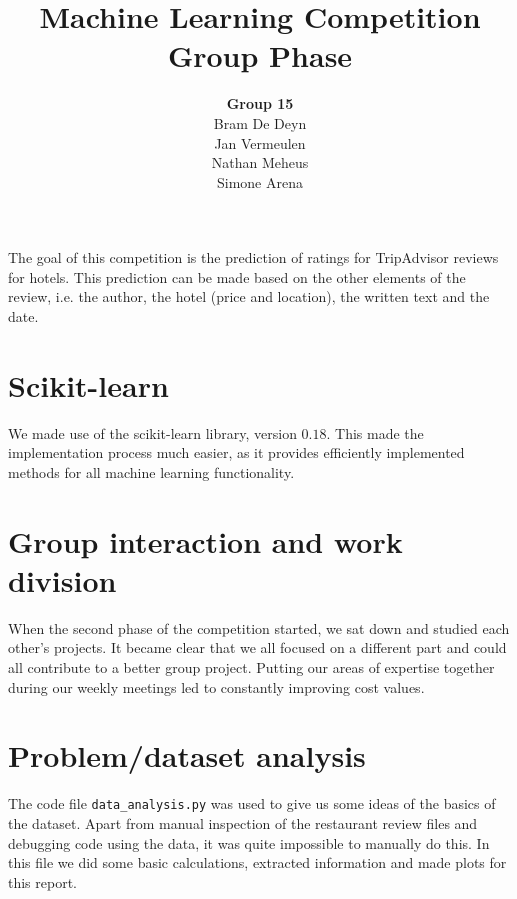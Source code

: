 \documentclass[a4paper,12pt]{article}
\begin{document}
\title{Machine Learning Competition \\
\textbf{Group Phase} \\
}
\author{
\textbf{Group 15} \\
Bram De Deyn \\
Jan Vermeulen \\
Nathan Meheus \\
Simone Arena}
\maketitle
{}

The goal of this competition is the prediction of ratings for TripAdvisor reviews for hotels. This prediction can be made based on the other elements of the review, i.e. the author, the hotel (price and location), the written text and the date.

\section{Scikit-learn}

We made use of the scikit-learn library, version $0.18$. This made the implementation process much easier, as it provides efficiently implemented methods for all machine learning functionality.

\section{Group interaction and work division}

When the second phase of the competition started, we sat down and studied each other's projects. It became clear that we all focused on a different part and could all contribute to a better group project. Putting our areas of expertise together during our weekly meetings led to constantly improving cost values.

\section{Problem/dataset analysis}

The code file \texttt{data\_analysis.py} was used to give us some ideas of the basics of the dataset. Apart from manual inspection of the restaurant review files and debugging code using the data, it was quite impossible to manually do this. In this file we did some basic calculations, extracted information and made plots for this report.
\end{document}
